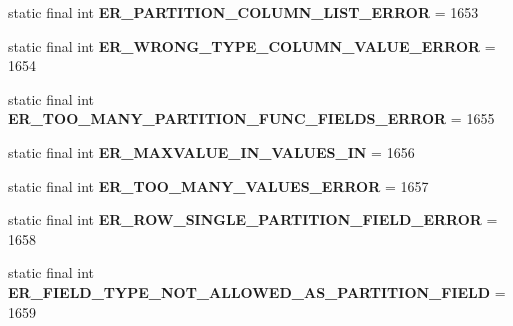 \begin{DoxyCompactItemize}
static final int {\bfseries E\+R\+\_\+\+P\+A\+R\+T\+I\+T\+I\+O\+N\+\_\+\+C\+O\+L\+U\+M\+N\+\_\+\+L\+I\+S\+T\+\_\+\+E\+R\+R\+OR} = 1653
\item 
\mbox{\label{classcom_1_1mysql_1_1jdbc_1_1_mysql_error_numbers_ac01cc18796a3923251a813e582b79a04}} 
static final int {\bfseries E\+R\+\_\+\+W\+R\+O\+N\+G\+\_\+\+T\+Y\+P\+E\+\_\+\+C\+O\+L\+U\+M\+N\+\_\+\+V\+A\+L\+U\+E\+\_\+\+E\+R\+R\+OR} = 1654
\item 
\mbox{\label{classcom_1_1mysql_1_1jdbc_1_1_mysql_error_numbers_a873c0552ccb685f7f63d9bd51ed98d71}} 
static final int {\bfseries E\+R\+\_\+\+T\+O\+O\+\_\+\+M\+A\+N\+Y\+\_\+\+P\+A\+R\+T\+I\+T\+I\+O\+N\+\_\+\+F\+U\+N\+C\+\_\+\+F\+I\+E\+L\+D\+S\+\_\+\+E\+R\+R\+OR} = 1655
\item 
\mbox{\label{classcom_1_1mysql_1_1jdbc_1_1_mysql_error_numbers_a5eec87057a2427cfd1df1c0bb6d8bcc0}} 
static final int {\bfseries E\+R\+\_\+\+M\+A\+X\+V\+A\+L\+U\+E\+\_\+\+I\+N\+\_\+\+V\+A\+L\+U\+E\+S\+\_\+\+IN} = 1656
\item 
\mbox{\label{classcom_1_1mysql_1_1jdbc_1_1_mysql_error_numbers_adf3062da069abce4554742161d9afb5d}} 
static final int {\bfseries E\+R\+\_\+\+T\+O\+O\+\_\+\+M\+A\+N\+Y\+\_\+\+V\+A\+L\+U\+E\+S\+\_\+\+E\+R\+R\+OR} = 1657
\item 
\mbox{\label{classcom_1_1mysql_1_1jdbc_1_1_mysql_error_numbers_a289ea4c3c64ca39c5eb1f29887d4658c}} 
static final int {\bfseries E\+R\+\_\+\+R\+O\+W\+\_\+\+S\+I\+N\+G\+L\+E\+\_\+\+P\+A\+R\+T\+I\+T\+I\+O\+N\+\_\+\+F\+I\+E\+L\+D\+\_\+\+E\+R\+R\+OR} = 1658
\item 
\mbox{\label{classcom_1_1mysql_1_1jdbc_1_1_mysql_error_numbers_a8f1305d05a1cde4153ee2ae8fc48124f}} 
static final int {\bfseries E\+R\+\_\+\+F\+I\+E\+L\+D\+\_\+\+T\+Y\+P\+E\+\_\+\+N\+O\+T\+\_\+\+A\+L\+L\+O\+W\+E\+D\+\_\+\+A\+S\+\_\+\+P\+A\+R\+T\+I\+T\+I\+O\+N\+\_\+\+F\+I\+E\+LD} = 1659
\item 
\mbox{\label{classcom_1_1mysql_1_1jdbc_1_1_mysql_error_numbers_aa64be14cd1f97d7e4f94184679982d69}} 

\end{DoxyCompactItemize}
